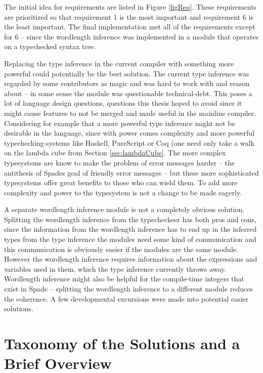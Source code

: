 The initial idea for requirements are listed in Figure \ref{figReq}. These requirements are prioritized so that requirement 1 is the most important and requirement 6 is the least important. The final implementation met all of the requirements except for 6 -- since the wordlength inference was implemented in a module that operates on a typechecked syntax tree.

Replacing the type inference in the current compiler with something more powerful could potentially be the best solution. The current type inference was regarded by some contributors as magic and was hard to work with and reason about -- in some sense the module was questionable technical-debt. This poses a lot of language design questions, questions this thesis hoped to avoid since it might cause features to not be merged and made useful in the mainline compiler. Considering for example that a more powerful type inference might not be desirable in the language, since with power comes complexity and more powerful typechecking-systems like Haskell, PureScript or Coq (one need only take a walk on the lambda cube from Section \ref{sec:lambdaCube}. The more complex typesystems are know to make the problem of error messages harder -- the antithesis of Spades goal of friendly error messages -- but these more sophisticated typesystems offer great benefits to those who can wield them. To add more complexity and power to the typesystem is not a change to be made eagerly.

A separate wordlength inference module is not a completely obvious solution. Splitting the wordlength inference from the typecheckeer has both pros and cons, since the information from the wordlength inference has to end up in the inferred types from the type inference the modules need some kind of communication and this communication is obviously easier if the modules are the same module. However the wordlength inference requires information about the expressions and variables used in them, which the type inference currently throws away. Wordlength inference might also be helpful for the compile-time integers that exist in Spade -- splitting the wordlength inference to a different module reduces the coherence. A few developmental excursions were made into potential easier solutions.

\section{Taxonomy of the Solutions and a Brief Overview}

